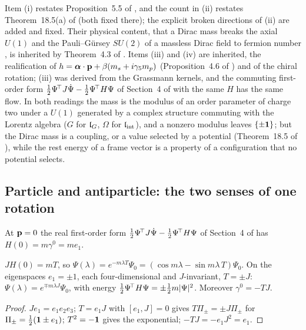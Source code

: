 Item (i) restates Proposition~5.5 of \cite{ES17}, and the count in (ii) restates Theorem~18.5(a) of \cite{ES17} (both fixed there); the explicit broken
directions of (ii) are added and fixed. Their physical content, that a Dirac mass breaks the axial $U(1)$ and the Pauli--G\"ursey $SU(2)$ of a
massless Dirac field to fermion number \cite{Pauli57,Gursey58}, is inherited by Theorem~4.3 of \cite{ES17}. Items (iii) and (iv) are inherited, the
realification of $h=\boldsymbol\alpha\cdot\mathbf p+\beta(m_s+i\gamma_5m_p)$ (Proposition~4.6 of \cite{ES17}) and of the chiral rotation; (iii) was derived
from the Grassmann kernels, and the commuting first-order form $\tfrac12\Psi^{\!\top}J\dot\Psi-\tfrac12\Psi^{\!\top}H\Psi$ of Section~4 of \cite{ES17} with the
same $H$ has the same flow. In both readings the mass is the modulus of an order parameter of charge two under a $U(1)$ generated by a complex
structure commuting with the Lorentz algebra ($G$ for $\mathfrak l_G$, $\Omega$ for $\mathfrak l_{\rm int}$), and a nonzero modulus leaves $\{\pm\mathbf 1\}$; but the Dirac mass is a
coupling, or a value selected by a potential (Theorem~18.5 of \cite{ES17}), while the rest energy of a frame vector is a property of a
configuration that no potential selects.

\subsection{Particle and antiparticle: the two senses of one rotation}
\label{d2:sec:senses}

At $\mathbf p=0$ the real first-order form $\tfrac12\Psi^{\!\top}J\dot\Psi-\tfrac12\Psi^{\!\top}H\Psi$ of Section~4 of \cite{ES17} has $H(0)=m\gamma^0=me_1$.

\begin{proposition}
\label{d2:prop:restflow}
$JH(0)=mT$, so $\Psi(\lambda)=e^{-m\lambda T}\Psi_0=(\cos m\lambda-\sin m\lambda\,T)\Psi_0$. On the eigenspaces $e_1=\pm1$, each four-dimensional and
$J$-invariant, $T=\pm J$: $\Psi(\lambda)=e^{\mp m\lambda J}\Psi_0$, with energy $\tfrac12\Psi^{\!\top}H\Psi=\pm\tfrac12 m|\Psi|^2$. Moreover $\gamma^0=-TJ$.
\end{proposition}

\begin{proof}
$Je_1=e_1e_2e_3$; $T=e_1J$ with $[e_1,J]=0$ gives $T\Pi_\pm=\pm J\Pi_\pm$ for $\Pi_\pm=\tfrac12(\mathbf 1\pm e_1)$; $T^2=-\mathbf 1$ gives the exponential;
$-TJ=-e_1J^2=e_1$.
\end{proof}

